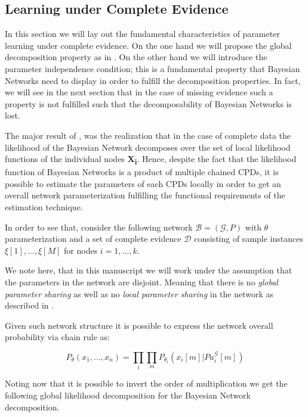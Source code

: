 \documentclass[11pt]{article}
\begin{document}
\begin{article}
\newpage


\section{Learning under Complete Evidence}
\label{complete-learning}
In this section we will lay out the fundamental characteristics of
parameter learning under complete evidence. On the one hand we will
propose the global decomposition property as in
\cite{spiegelhalter1990sequential}. On the other hand we will
introduce the parameter independence condition; this is a
fundamental property that Bayesian Networks need to display in order
to fulfill the decomposition properties. In fact, we will see in the
next section that in the case of missing evidence such a property is
not fulfilled such that the decomposability of Bayesian Networks is
lost.

The major result of \cite{spiegelhalter1990sequential}, was the
realization that in the case of complete data the likelihood of the
Bayesian Network decomposes over the set of local likelihood
functions of the individual nodes \textbf{X\textsubscript{i}}. Hence, despite the fact
that the likelihood function of Bayesian Networks is a product of
multiple chained CPDs, it is possible to estimate the parameters of
each CPDs locally in order to get an overall network
parameterization fulfilling the functional requirements of the
estimation technique.

In order to see that, consider the following network \(\mathscr{B} =
  (\mathscr{G}, P)\) with \(\theta\) parameterization and a set of complete
evidence \(\mathscr{D}\) consisting of sample instances \(\xi[1], ...,
  \xi[M]\) for nodes \(i = 1, ..., k\).

We note here, that in this manuscript we will work under the
assumption that the parameters in the network are disjoint. Meaning
that there is no \emph{global parameter sharing} as well as no \emph{local
parameter sharing} in the network as described in
\cite{koller2009probabilistic}.

Given such network structure it is possible to express the network
overall probability via chain rule as:

\begin{equation} \label{eq:global_decomposition}
P_{\theta} (x_1, ..., x_n) = \prod_i \prod_m P_{\theta_i}(x_i[m] | Pa_i^{\mathscr{G}}[m])  \nonumber
\end{equation}

Noting now that it is possible to invert the order of multiplication
we get the following global likelihood decomposition for the
Bayesian Network decomposition. 


\end{article}
\end{document}
